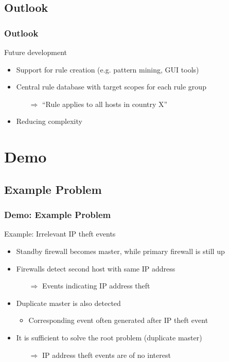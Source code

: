 \documentclass[10pt]{beamer}
\begin{document}
\subsection{Outlook}
\begin{frame}
	\frametitle{Outlook}
	\begin{block}{Future development}
		\begin{itemize}
			\item Support for rule creation (e.g. pattern mining, GUI tools)
			\item Central rule database with target scopes for each rule group
				\begin{itemize}
					\item[$\Rightarrow$] ``Rule applies to all hosts in country X'' 
				\end{itemize}
			\item Reducing complexity
		\end{itemize}
	\end{block}
\end{frame}

\section{Demo}

\subsection{Example Problem}

\begin{frame}
	\frametitle{Demo: Example Problem}
	\begin{block}{Example: Irrelevant IP theft events}
		\begin{itemize}
			\item Standby firewall becomes master, while primary firewall is
				still up

			\item Firewalls detect second host with same IP address
				\begin{itemize}
					\item[$\Rightarrow$] Events indicating IP address theft
				\end{itemize}

			\item Duplicate master is also detected
				\begin{itemize}
					\item Corresponding event often generated after IP theft
						event
				\end{itemize}

			\item It is sufficient to solve the root problem (duplicate master)
				\begin{itemize}
					\item[$\Rightarrow$] IP address theft events are of no interest
				\end{itemize}
		\end{itemize}
	\end{block}
\end{frame}
\end{document}
